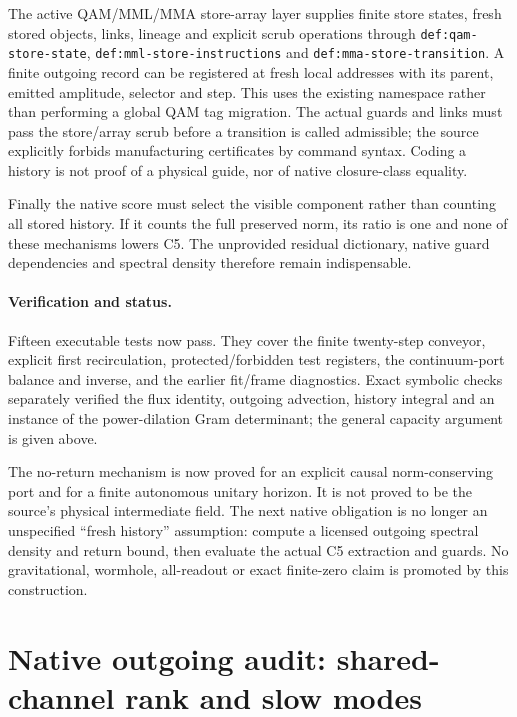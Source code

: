 \documentclass[11pt,a4paper]{article}
\begin{document}
The active QAM/MML/MMA store-array layer supplies finite store states,
fresh stored objects, links, lineage and explicit scrub operations
through \texttt{def:qam-store-state},
\texttt{def:mml-store-instructions} and
\texttt{def:mma-store-transition}. A finite outgoing record can be
registered at fresh local addresses with its parent, emitted amplitude,
selector and step. This uses the existing namespace rather than
performing a global QAM tag migration. The actual guards and links
must pass the store/array scrub before a transition is called
admissible; the source explicitly forbids manufacturing certificates
by command syntax. Coding a history is not proof of a physical
guide, nor of native closure-class equality.

Finally the native score must select the visible component rather
than counting all stored history. If it counts the full preserved
norm, its ratio is one and none of these mechanisms lowers C5.
The unprovided residual dictionary, native guard dependencies and
spectral density therefore remain indispensable.

\paragraph{Verification and status.}
Fifteen executable tests now pass. They cover the finite twenty-step
conveyor, explicit first recirculation, protected/forbidden test
registers, the continuum-port balance and inverse, and the earlier
fit/frame diagnostics. Exact symbolic checks separately verified
the flux identity, outgoing advection, history integral and an
instance of the power-dilation Gram determinant; the general
capacity argument is given above.

The no-return mechanism is now proved for an explicit causal
norm-conserving port and for a finite autonomous unitary horizon.
It is not proved to be the source's physical intermediate field.
The next native obligation is no longer an unspecified ``fresh
history'' assumption: compute a licensed outgoing spectral density
and return bound, then evaluate the actual C5 extraction and guards.
No gravitational, wormhole, all-readout or exact finite-zero claim
is promoted by this construction.

\section{Native outgoing audit: shared-channel rank and slow modes}
\label{sec:native-outgoing-rank-audit}
\end{document}
